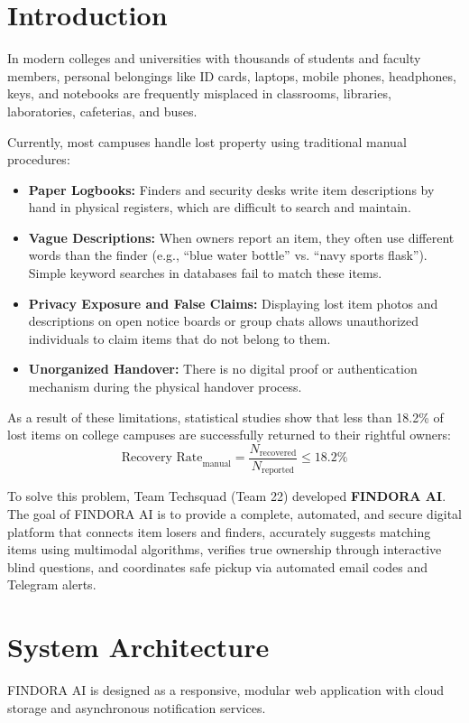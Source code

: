 \documentclass[conference]{IEEEtran}
\begin{document}
\section{Introduction}
In modern colleges and universities with thousands of students and faculty members, personal belongings like ID cards, laptops, mobile phones, headphones, keys, and notebooks are frequently misplaced in classrooms, libraries, laboratories, cafeterias, and buses.

Currently, most campuses handle lost property using traditional manual procedures:
\begin{itemize}
    \item \textbf{Paper Logbooks:} Finders and security desks write item descriptions by hand in physical registers, which are difficult to search and maintain.
    \item \textbf{Vague Descriptions:} When owners report an item, they often use different words than the finder (e.g., ``blue water bottle'' vs. ``navy sports flask''). Simple keyword searches in databases fail to match these items.
    \item \textbf{Privacy Exposure and False Claims:} Displaying lost item photos and descriptions on open notice boards or group chats allows unauthorized individuals to claim items that do not belong to them.
    \item \textbf{Unorganized Handover:} There is no digital proof or authentication mechanism during the physical handover process.
\end{itemize}

As a result of these limitations, statistical studies show that less than 18.2\% of lost items on college campuses are successfully returned to their rightful owners:
\begin{equation}
    \text{Recovery Rate}_{\text{manual}} = \frac{N_{\text{recovered}}}{N_{\text{reported}}} \le 18.2\%
\end{equation}

To solve this problem, Team Techsquad (Team 22) developed \textbf{FINDORA AI}. The goal of FINDORA AI is to provide a complete, automated, and secure digital platform that connects item losers and finders, accurately suggests matching items using multimodal algorithms, verifies true ownership through interactive blind questions, and coordinates safe pickup via automated email codes and Telegram alerts.

\section{System Architecture}
FINDORA AI is designed as a responsive, modular web application with cloud storage and asynchronous notification services.
\end{document}
